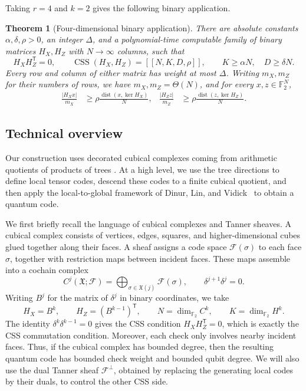 \documentclass[11pt,letterpaper]{article}
\renewcommand{\ge}{\geqslant}
\newtheorem{theorem}{Theorem}[section]
\theoremstyle{definition}
\theoremstyle{remark}
\newcommand{\F}{\mathbb F}
\newcommand{\cF}{\mathcal F}
\newcommand{\X}{\mathfrak{X}}
\newcommand{\CSS}{\operatorname{CSS}}
\newcommand{\dist}{\operatorname{dist}}
\begin{document}
Taking $r=4$ and $k=2$ gives the following binary application.


\begin{theorem}[Four-dimensional binary application]\label{thm:main-original}
There are absolute constants $\alpha,\delta,\rho>0$, an integer
$\Delta$, and a polynomial-time computable family of binary matrices
$H_X,H_Z$ with $N\to\infty$ columns, such that
\[
 H_XH_Z^{\mathsf T}=0,\qquad
 \CSS(H_X,H_Z)=[[N,K,D,\rho]],\qquad
 K\ge\alpha N,\quad D\ge\delta N.
\]
Every row and column of either matrix has weight at most $\Delta$.
Writing $m_X,m_Z$ for their numbers of rows, we have $m_X,m_Z=\Theta(N)$,
and for every $x,z\in\F_2^{N}$,
\begin{align*}
 \frac{|H_Xx|}{m_X}&\ge\rho\frac{\dist(x,\ker H_X)}{N},
 &\frac{|H_Zz|}{m_Z}&\ge\rho\frac{\dist(z,\ker H_Z)}{N}.
 \label{eq:main-soundness}
\end{align*}
\end{theorem}

%
\subsection{Technical overview}
\label{sec:technical-overview}
\label{sec:technical-overview-new}

Our construction uses decorated cubical complexes coming from arithmetic quotients of products of trees \cite{RSV2019,HLMRZ2025}. At a high level, we use the tree directions to define local tensor codes, descend these codes to a finite cubical quotient, and then apply the local-to-global framework of Dinur, Lin, and Vidick~\cite{DinurLinVidick2024} to obtain a quantum code. 

We first briefly recall the language of cubical complexes and Tanner sheaves. A cubical complex consists of vertices, edges, squares, and higher-dimensional cubes glued together along their faces. A sheaf assigns a code space $\cF(\sigma)$ to each face $\sigma$, together with restriction maps between incident faces. These maps assemble into a cochain complex
\[
 C^j(\X;\cF)=\bigoplus_{\sigma\in\X(j)}\cF(\sigma),
 \qquad \delta^{j+1}\delta^j=0.
\]
Writing $B^j$ for the matrix of $\delta^j$ in binary coordinates, we take
\[
 H_X=B^k,\qquad H_Z=(B^{k-1})^{\mathsf T},\qquad
 N=\dim_{\F_2}C^k,\qquad K=\dim_{\F_2}H^k.
\]
The identity $\delta^k\delta^{k-1}=0$ gives the CSS condition $H_XH_Z^{\mathsf T}=0$, which is exactly the CSS commutation condition. Moreover, each check only involves nearby incident faces. Thus, if the cubical complex has bounded degree, then the resulting quantum code has bounded check weight and bounded qubit degree. We will also use the dual Tanner sheaf $\cF^\perp$, obtained by replacing the generating local codes by their duals, to control the other CSS side.
\end{document}
